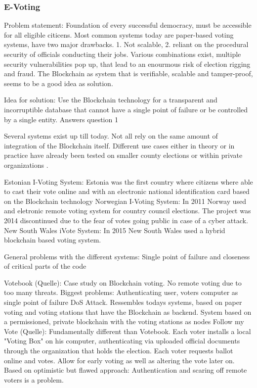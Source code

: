 \subsubsection{E-Voting}
Problem statement: Foundation of every successful democracy, must be accessible for all eligible citicens. Most common systems today are paper-based voting systems, have two major drawbacks. 1. Not scalable, 2. reliant on the procedural security of officials conducting their jobs. Various combinations exist, multiple security vulnerabilities pop up, that lead to an enourmous risk of election rigging and fraud. The Blockchain as system that is verifiable, scalable and tamper-proof, seems to be a good idea as solution. 

Idea for solution: Use the Blockchain technology for a transparent and incorruptible database that cannot have a single point of failure or be controlled by a single entity. Answers question 1

Several systems exist up till today. Not all rely on the same amount of integration of the Blockchain itself. Different use cases either in theory or in practice have already been tested on smaller county elections or within private organizations \cite{BenAyed2017}.

Estonian I-Voting System: Estonia was the first country where citizens where able to cast their vote online and with an electronic national identification card based on the Blockchain technology
Norwegian I-Voting System: In 2011 Norway used and eletronic remote voting system  for country council elections. The project was 2014 discontinued due to the fear of votes going public in case of a cyber attack.
New South Wales iVote System: In 2015 New South Wales used a hybrid blockchain based voting system.

General problems with the different systems: Single point of failure and closeness of critical parts of the code


Votebook (Quelle): Case study on Blockchain voting. No remote voting due to too many threats. Biggest problems: Authenticating user, voters computer as single point of failure DoS Attack.
Ressembles todays systems, based on paper voting and voting stations that have the Blockchain as backend.
System based on a permissioned, private blockchain with the voting stations as nodes
Follow my Vote (Quelle): Fundamentally different than Votebook. Each voter installs a local "Voting Box" on his computer, authenticating via uploaded official documents through the organization that holds the election. Each voter requests ballot online and votes. Allow for early voting as well as altering the vote later on. Based on  \citeauthor{Osgood2016} optimistic but flawed approach: Authentication and scaring off remote voters is a problem.

